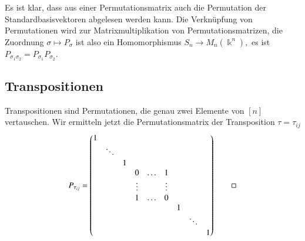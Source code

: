 Es ist klar, dass aus einer Permutationsmatrix auch die Permutation
der Standardbasisvektoren abgelesen werden kann.
Die Verknüpfung von Permutationen wird zur Matrixmultiplikation
von Permutationsmatrizen, die Zuordnung $\sigma\mapsto P_\sigma$
ist also ein Homomorphismus
$
S_n \to M_n(\Bbbk^n),
$
es ist $P_{\sigma_1\sigma_2}=P_{\sigma_1}P_{\sigma_2}$.

\subsection{Transpositionen}
Transpositionen sind Permutationen, die genau zwei Elemente von $[n]$
vertauschen.
Wir ermitteln jetzt die Permutationsmatrix der Transposition $\tau=\tau_{ij}$
\[
P_{\tau_{ij}}
=
\begin{pmatrix}
1&      & &      &     &      & &      & \\
 &\ddots& &      &     &      & &      & \\
 &      &1&      &     &      & &      & \\
 &      & &0     &\dots&1     & &      & \\
 &      & &\vdots&     &\vdots& &      & \\
 &      & &1     &\dots&0     & &      & \\
 &      & &      &     &      &1&      & \\
 &      & &      &     &      & &\ddots& \\
 &      & &      &     &      & &      &1
\end{pmatrix}
\qedhere
\]


